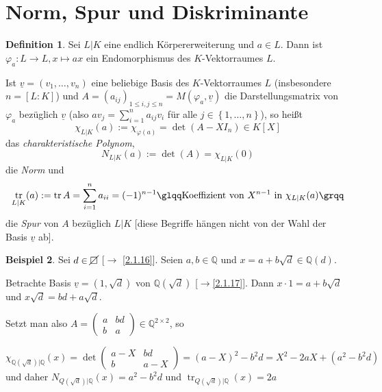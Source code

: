 \documentclass[
twoside=semi,
fontsize=12,
DIV=12, 
cleardoublepage=current,
leqno,
headings=optiontoheadandtoc, 
toc=idx
]{scrbook}
\newcommand{\Q}{\mathbb{Q}}
\newcommand{\nsquare}{\cancel{\square}}
\newcommand{\set}[1]{\left\{ #1 \right\}}
\DeclareMathOperator{\tr}{tr}
\theoremstyle{definition}
\newtheorem{definition}{Definition}[section]
\newtheorem{beispiel}[definition]{Beispiel}
\begin{document}
   	\section{Norm, Spur und Diskriminante}\thispagestyle{sectionstart}
   	\begin{definition}\label{2.4.1}\hfill\newline
   		Sei $L|K$ eine endlich K\"orpererweiterung und $a \in L$. Dann ist $\varphi_a:L \to L, x \mapsto ax$ ein Endomorphismus des $K$-Vektorraumes $L$.
   		
   		\noindent Ist $\underline{v} = (v_1, \dots, v_n)$ eine beliebige Basis des $K$-Vektorraumes $L$ (insbesondere \linebreak $n = [L:K]$) und $A = (a_{ij})_{1\leq i,j \leq n} = M(\varphi_a, \underline{v})$ die Darstellungsmatrix von $\varphi_a$ bez\"uglich $\underline{v}$ (also $\displaystyle av_j = \sum_{i=1}^{n} a_{ij}v_i$ f\"ur alle $j \in \set{1,\dots, n}$), so hei\ss t \[\chi_{L|K}(a) := \chi_{\varphi(a)} = \det (A-XI_n) \in K[X]\] 
   		das \emph{charakteristische Polynom}, 
   		\[N_{L|K}(a) := \det(A) = \chi_{L|K}(0)\] 
   		die \emph{Norm} und 
   		\[\displaystyle \tr_{L|K}(a) := \tr A = \sum_{i=1}^n a_{ii} = (-1)^{n-1}\glqq\textrm{Koeffizient von } X^{n-1} \textrm{ in } \chi_{L|K}(a)\grqq\] die \emph{Spur} von $A$ bez\"uglich $L|K$ [diese Begriffe h\"angen nicht von der Wahl der Basis $\underline{v}$ ab].
   	\end{definition}
   	
   	\begin{beispiel}\label{2.4.2}\hfill\newline
   		Sei $d \in \nsquare$ [$\to$ \ref{2.1.16}]. Seien $a,b \in \Q$ und $x = a + b\sqrt{d} \in \Q(d)$.
   		
   		\noindent Betrachte Basis $\underline{v}= (1,\sqrt{d})$ von $\Q(\sqrt{d})$ [$\to$\ref{2.1.17}]. Dann $x\cdot 1 = a + b\sqrt{d}$ und \linebreak $x \sqrt{d} = bd + a\sqrt{d}$.
   		
   		\noindent Setzt man also $A = \begin{pmatrix} a&bd\\b&a \end{pmatrix} \in \Q^{2\times 2}$, so 
   		
   		\[\chi_{\Q(\sqrt{d})|\Q}(x) = \det \begin{pmatrix} a - X&bd\\b&a - X\end{pmatrix} = (a-X)^2 - b^2d = X^2 - 2aX + (a^2-b^2d)\] 
   		und daher $N_{Q(\sqrt{d})|\Q}(x) = a^2-b^2d$ und $\tr_{Q(\sqrt{d})|\Q}(x) = 2a$
   	\end{beispiel}
\end{document}
